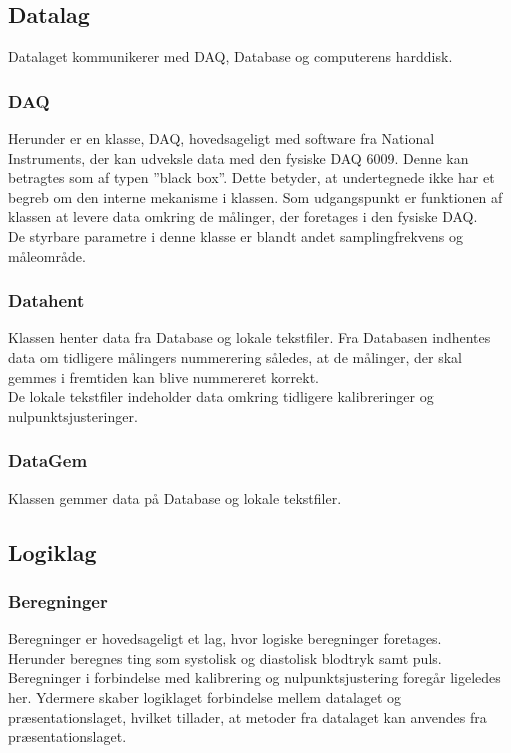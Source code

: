 \subsection{Datalag}
Datalaget kommunikerer med DAQ, Database og computerens harddisk. 

\subsubsection{DAQ}
Herunder er en klasse, DAQ, hovedsageligt med software fra National Instruments, der kan udveksle data med den fysiske DAQ 6009. Denne kan betragtes som af typen ”black box”. Dette betyder, at undertegnede ikke har et begreb om den interne mekanisme i klassen. Som udgangspunkt er funktionen af klassen at levere data omkring de målinger, der foretages i den fysiske DAQ.\\
De styrbare parametre i denne klasse er blandt andet samplingfrekvens og måleområde. 

\subsubsection{Datahent}
Klassen henter data fra Database og lokale tekstfiler. Fra Databasen indhentes data om tidligere målingers nummerering således, at de målinger, der skal gemmes i fremtiden kan blive nummereret korrekt.\\
De lokale tekstfiler indeholder data omkring tidligere kalibreringer og nulpunktsjusteringer.

\subsubsection{DataGem}
Klassen gemmer data på Database og lokale tekstfiler.

\subsection{Logiklag}

\subsubsection{Beregninger}
Beregninger er hovedsageligt et lag, hvor logiske beregninger foretages.\\
Herunder beregnes ting som systolisk og diastolisk blodtryk samt puls. Beregninger i forbindelse med kalibrering og nulpunktsjustering foregår ligeledes her. Ydermere skaber logiklaget forbindelse mellem datalaget og præsentationslaget, hvilket tillader, at metoder fra datalaget kan anvendes fra præsentationslaget.

